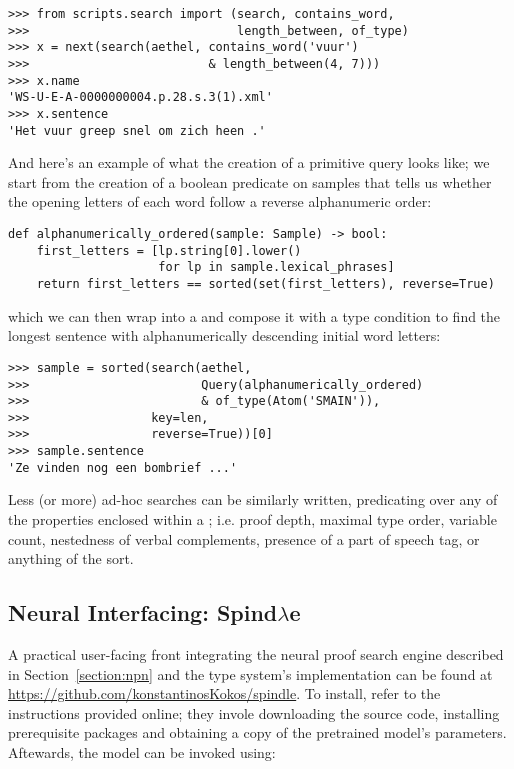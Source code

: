 \begin{verbatim}
>>> from scripts.search import (search, contains_word,
>>>                             length_between, of_type)
>>> x = next(search(aethel, contains_word('vuur')  
>>>                         & length_between(4, 7)))
>>> x.name
'WS-U-E-A-0000000004.p.28.s.3(1).xml'
>>> x.sentence
'Het vuur greep snel om zich heen .'
\end{verbatim}

\noindent And here's an example of what the creation of a primitive query looks like; we start from the creation of a boolean predicate on samples that tells us whether the opening letters of each word follow a reverse alphanumeric order:
\begin{verbatim}
def alphanumerically_ordered(sample: Sample) -> bool:
    first_letters = [lp.string[0].lower() 
                     for lp in sample.lexical_phrases]
    return first_letters == sorted(set(first_letters), reverse=True)
\end{verbatim}

\noindent which we can then wrap into a  and compose it with a type condition to find the longest sentence with alphanumerically descending initial word letters:

\begin{verbatim}
>>> sample = sorted(search(aethel, 
>>>                        Query(alphanumerically_ordered)
>>>                        & of_type(Atom('SMAIN')),
>>>                 key=len,
>>>                 reverse=True))[0]
>>> sample.sentence
'Ze vinden nog een bombrief ...'
\end{verbatim}

\noindent Less (or more) ad-hoc searches can be similarly written, predicating over any of the properties enclosed within a ; i.e. proof depth, maximal type order, variable count, nestedness of verbal complements, presence of a part of speech tag, or anything of the sort.

\subsection{Neural Interfacing: Spind$\lambda$e}
\label{subappendix:spindle}
A practical user-facing front integrating the neural proof search engine described in Section~\ref{section:npn} and the type system's implementation can be found at
\url{https://github.com/konstantinosKokos/spindle}. 
To install, refer to the instructions provided online; they invole downloading the source code, installing prerequisite packages and obtaining a copy of the pretrained model's parameters.
Aftewards, the model can be invoked using:

